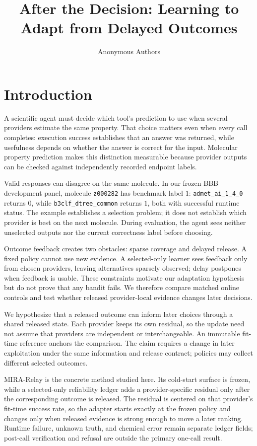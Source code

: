 \documentclass[sigconf,anonymous]{aamas}
\title{After the Decision: Learning to Adapt from Delayed Outcomes}
\author{Anonymous Authors}
\begin{document}
\maketitle

\section{Introduction}
A scientific agent must decide which tool's prediction to use when several providers estimate the same property. That choice matters even when every call completes: execution success establishes that an answer was returned, while usefulness depends on whether the answer is correct for the input. Molecular property prediction makes this distinction measurable because provider outputs can be checked against independently recorded endpoint labels.

Valid responses can disagree on the same molecule. In our frozen BBB development panel, molecule \texttt{z000282} has benchmark label $1$: \texttt{admet\_ai\_1\_4\_0} returns $0$, while \texttt{b3clf\_dtree\_common} returns $1$, both with successful runtime status. The example establishes a selection problem; it does not establish which provider is best on the next molecule. During evaluation, the agent sees neither unselected outputs nor the current correctness label before choosing.

Outcome feedback creates two obstacles: sparse coverage and delayed release. A fixed policy cannot use new evidence. A selected-only learner sees feedback only from chosen providers, leaving alternatives sparsely observed; delay postpones when feedback is usable. These constraints motivate our adaptation hypothesis but do not prove that any bandit fails. We therefore compare matched online controls and test whether released provider-local evidence changes later decisions.

We hypothesize that a released outcome can inform later choices through a shared released state. Each provider keeps its own residual, so the update need not assume that providers are independent or interchangeable. An immutable fit-time reference anchors the comparison. The claim requires a change in later exploitation under the same information and release contract; policies may collect different selected outcomes.

MIRA-Relay is the concrete method studied here. Its cold-start surface is frozen, while a selected-only reliability ledger adds a provider-specific residual only after the corresponding outcome is released. The residual is centered on that provider's fit-time success rate, so the adapter starts exactly at the frozen policy and changes only when released evidence is strong enough to move a later ranking. Runtime failure, unknown truth, and chemical error remain separate ledger fields; post-call verification and refusal are outside the primary one-call result.
\end{document}
